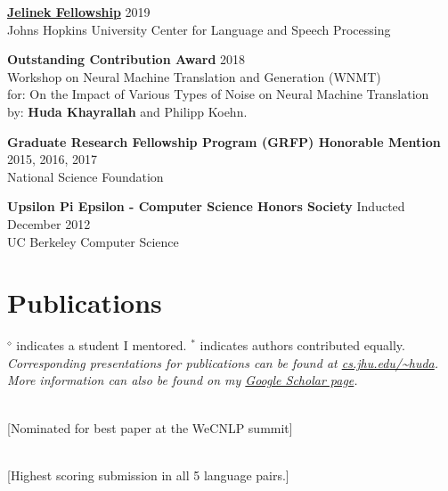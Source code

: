 \documentclass[margin,line,hyperref,color]{res}
\begin{document}
\begin{resume}
\textbf{\href{https://www.clsp.jhu.edu/about/jelinek-fellowship/}{Jelinek Fellowship}}
  \hfill  2019\\
Johns Hopkins University Center for Language and Speech Processing

\textbf{Outstanding Contribution Award}  \hfill 2018\\
 Workshop on Neural Machine Translation and Generation (WNMT) \\
for: On the Impact of Various Types of Noise on Neural Machine Translation \\
by: \textbf{Huda Khayrallah} and Philipp Koehn.

\textbf{Graduate Research Fellowship Program (GRFP) Honorable Mention}
  \hfill  2015, 2016, 2017\\
National Science Foundation

\textbf{Upsilon Pi Epsilon - Computer Science Honors Society}
  \hfill Inducted December 2012\\
UC Berkeley Computer Science



\section{\sc Publications}
$^\diamond$ indicates a student I mentored.
$^*$ indicates authors contributed equally.\\
{\it Corresponding presentations for publications can be found at \href{http://cs.jhu.edu/~huda/}{cs.jhu.edu/\~{ }huda}.\\
More information can also be found on my \href{https://scholar.google.com/citations?user=muJh2XQAAAAJ&hl=en&oi=ao}{Google Scholar page}.}

\\
{\textcolor{darkcandyapplered}{[Nominated for best paper at the WeCNLP summit]}} 



\\
{\textcolor{darkcandyapplered}{[Highest scoring submission in all 5 language pairs.]}}






\end{resume}
\end{document}
